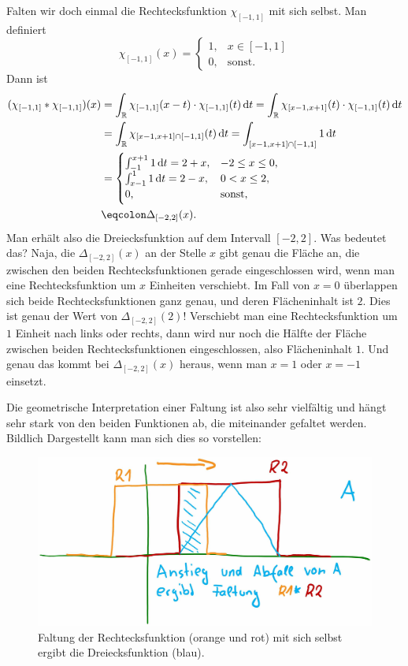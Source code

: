 \begin{example}[Faltung]
Falten wir doch einmal die Rechtecksfunktion $ \chi_{[-1,1]} $ mit sich selbst. Man definiert
\[
  \chi_{[-1,1]}(x) = \begin{cases} 1, & x \in [-1,1] \\ 0, & \text{sonst}. \end{cases}
\]
Dann ist
\begin{align*}
   (\chi_{[-1,1]} * \chi_{[-1,1]})(x) 
&= \int_{\R} \chi_{[-1,1]}(x - t) \cdot \chi_{[-1,1]}(t) \dif t
 = \int_{\R} \chi_{[x - 1, x + 1]}(t) \cdot \chi_{[-1,1]}(t) \dif t \\
&= \int_{\R} \chi_{[x - 1, x + 1] \cap [-1,1]}(t) \dif t
 = \int_{[x - 1, x + 1] \cap [-1,1]} 1 \dif t \\
&= \begin{cases}
      \int_{-1}^{x+1} 1 \dif t = 2 + x, & -2 \leq x \leq 0, \\
      \int_{x-1}^{1} 1 \dif t = 2 - x, & 0 < x \leq 2, \\
      0, & \text{sonst},
   \end{cases} \\
&\eqcolon \Delta_{[-2,2]}(x).
\end{align*}
Man erhält also die Dreiecksfunktion auf dem Intervall $ [-2,2] $. Was bedeutet das? Naja, die
$ \Delta_{[-2,2]}(x) $ an der Stelle $ x $ gibt genau die Fläche an, die zwischen den beiden 
Rechtecksfunktionen gerade eingeschlossen wird, wenn man eine Rechtecksfunktion um $ x $ Einheiten
verschiebt. Im Fall von $ x = 0 $ überlappen sich beide Rechtecksfunktionen ganz genau, und deren
Flächeninhalt ist $ 2 $. Dies ist genau der Wert von $ \Delta_{[-2,2]}(2) $! Verschiebt man eine
Rechtecksfunktion um $ 1 $ Einheit nach links oder rechts, dann wird nur noch die Hälfte der
Fläche zwischen beiden Rechtecksfunktionen eingeschlossen, also Flächeninhalt $ 1 $. Und genau das
kommt bei $ \Delta_{[-2,2]}(x) $ heraus, wenn man $ x = 1 $ oder $ x = -1 $ einsetzt.

Die geometrische Interpretation einer Faltung ist also sehr vielfältig und hängt sehr stark von den
beiden Funktionen ab, die miteinander gefaltet werden.\\
Bildlich Dargestellt kann man sich dies so vorstellen:
\begin{figure}[h]
	\centering
	\includegraphics[width=0.7\linewidth]{Bilder/Faltung}
	\caption{Faltung der Rechtecksfunktion (orange und rot) mit sich selbst ergibt die 
  	Dreiecksfunktion (blau).}
	\label{fig:faltung}
\end{figure}
\end{example}

